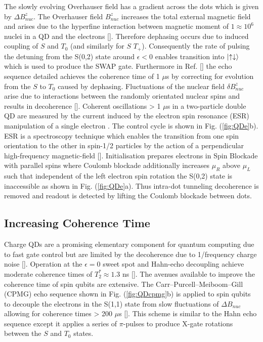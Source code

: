 The slowly evolving Overhauser field has a gradient across the dots which is given by $\Delta B^{z}_{nuc}$. The Overhauser field $B^{z}_{nuc}$ increases the total external magnetic field and arises due to the hyperfine interaction between magnetic moment of $1\approx 10^{6}$ nuclei in a QD and the electrons []. Therefore dephasing occurs due to induced coupling of $S$ and $T_{0}$ (and similarly for $S$ $T_{+}$). Consequently the rate of pulsing the detuning from the S(0,2) state around $\epsilon < 0$ enables transition into $\lvert\uparrow \downarrow\rangle$ which is used to produce the SWAP gate. Furthermore in Ref. [] the echo sequence detailed achieves the coherence time of 1 $\mu$s by correcting for evolution from the $S$ to $T_{0}$ caused by dephasing. Fluctuations of the nuclear field $\delta B^{z}_{nuc}$ arise due to interactions between the randomly orientated nuclear spins and results in decoherence  []. Coherent oscillations > 1 $\mu$s in a two-particle double QD are measured by the current induced by the electron spin resonance (ESR) manipulation of a single electron \citep{Koppens2006DrivenDot}. The control cycle is shown in Fig. (\ref{fig:QDe}b). ESR is a spectroscopy technique which enables the transition from one spin orientation to the other in spin-1/2 particles by the action of a perpendicular high-frequency magnetic-field []. Initialisation prepares electrons in Spin Blockade with parallel spins where Coulomb blockade additionally increases $\mu_{R}$ above $\mu_{L}$ such that independent of the left electron spin rotation the S(0,2) state is inaccessible as shown in Fig. (\ref{fig:QDe}a). Thus intra-dot tunneling decoherence is removed and readout is detected by lifting the Coulomb blockade between dots.  


\subsection{Increasing Coherence Time}
Charge QDs are a promising elementary component for quantum computing due to fast gate control but are limited by the decoherence due to 1/frequency charge noise []. Operation at the $\epsilon=0$ sweet spot and Hahn-echo decoupling achieve moderate coherence times of $T_{2}^{*} \approx 1.3$ ns []. The avenues available to improve the coherence time of spin qubits are extensive. The Carr–Purcell–Meiboom–Gill (CPMG) echo sequence shown in Fig. (\ref{fig:QDcpmg}b) is applied to spin qubits to decouple the electrons in the S(1,1) state from slow fluctuations of $\Delta B_{nuc}$ allowing for coherence times > 200 $\mu$s []. This scheme is similar to the Hahn echo sequence except it applies a series of $\pi$-pulses to produce X-gate rotations between the $S$ and $T_{0}$ states. 

